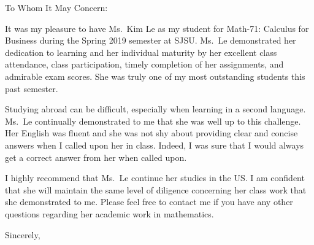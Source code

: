 \documentclass[letterpaper,12pt]{letter}
\date{21 May 2019}
\begin{document}
\begin{letter}{}
\opening{To Whom It May Concern:}
It was my pleasure to have Ms.~Kim Le as my student for Math-71: Calculus for Business during the Spring 2019 semester at
SJSU.  Ms.~Le demonstrated her dedication to learning and her individual maturity by her excellent class attendance,
class participation, timely completion of her assignments, and admirable exam scores.  She was truly one of my most
outstanding students this past semester.

Studying abroad can be difficult, especially when learning in a second language.  Ms.~Le continually demonstrated to me that
she was well up to this challenge.  Her English was fluent and she was not shy about providing clear and concise answers
when I called upon her in class.  Indeed, I was sure that I would always get a correct answer from her when called upon.

I highly recommend that Ms.~Le continue her studies in the US.  I am confident that she will maintain the same level of
diligence concerning her class work that she demonstrated to me.  Please feel free to contact me if you have any other
questions regarding her academic work in mathematics.
\closing{Sincerely,}
\end{letter}
\end{document}
